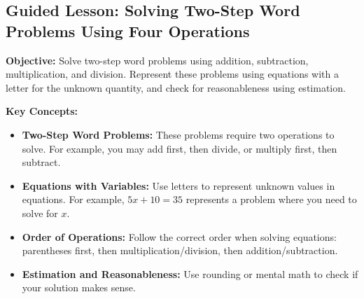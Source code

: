 \documentclass[12pt]{article}
\title{}
\date{}
\begin{document}
\subsection*{Guided Lesson: Solving Two-Step Word Problems Using Four Operations}
\onehalfspacing

\vspace{1cm}

\begin{tcolorbox}[colframe=black!40, colback=gray!5, 
coltitle=black, colbacktitle=black!20, fonttitle=\bfseries\Large, 
title=Learning Objective, halign title=center, left=5pt, right=5pt, top=5pt, bottom=15pt]
\textbf{Objective:} Solve two-step word problems using addition, subtraction, multiplication, and division. Represent these problems using equations with a letter for the unknown quantity, and check for reasonableness using estimation.
\end{tcolorbox}

\vspace{1em}

\begin{tcolorbox}[colframe=black!60, colback=white, 
coltitle=black, colbacktitle=black!15, fonttitle=\bfseries\Large, 
title=Key Concepts and Vocabulary, halign title=center, left=10pt, right=10pt, top=10pt, bottom=15pt]
\textbf{Key Concepts:}
\begin{itemize}
    \item \textbf{Two-Step Word Problems:} These problems require two operations to solve. For example, you may add first, then divide, or multiply first, then subtract.
    \item \textbf{Equations with Variables:} Use letters to represent unknown values in equations. For example, \(5x + 10 = 35\) represents a problem where you need to solve for \(x\).
    \item \textbf{Order of Operations:} Follow the correct order when solving equations: parentheses first, then multiplication/division, then addition/subtraction.
    \item \textbf{Estimation and Reasonableness:} Use rounding or mental math to check if your solution makes sense.
\end{itemize}
\end{tcolorbox}

\vspace{1em}
\end{document}

